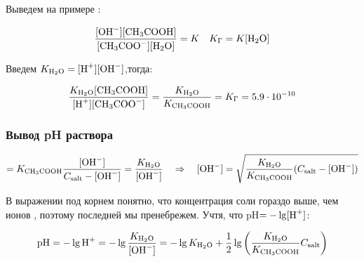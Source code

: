 \documentclass[a4paper, 12pt]{article}
\newcommand{\qrq}
{\ensuremath{\quad \Rightarrow \quad}} %
\begin{document}
Выведем на примере :



\begin{equation*}
	\frac{[\ce{OH-}][\ce{CH3COOH}]}{[\ce{CH3COO-}][\ce{H2O}]} = K \quad K_\Gamma = K[\ce{H2O}] 
\end{equation*}

Введем $K_{\ce{H2O}} = [\ce{H+}][\ce{OH-}]$,тогда:

\begin{equation*}
	\frac{K_{\ce{H2O}}[\ce{CH3COOH}]}{[\ce{H+}][\ce{CH3COO-}]} = \frac{K_{\ce{H2O}}}{K_{\ce{CH3COOH}}} = K_\Gamma = 5.9 \cdot 10^{-10}
\end{equation*}

\subsubsection*{Вывод pH раствора}

\begin{equation*}
	[\ce{H+}] = K_{\ce{CH3COOH}} \frac{[\ce{OH-}]}{C_{\text{salt}} - [\ce{OH-}]} = \frac{K_{\ce{H2O}}}{[\ce{OH-}]} \qrq [\ce{OH-}] = \sqrt{\frac{K_{\ce{H2O}}}{K_{\ce{CH3COOH}}} (C_{\text{salt}} - [\ce{OH-}])}
\end{equation*}

В выражении под корнем понятно, что концентрация соли гораздо выше, чем ионов , поэтому последней мы пренебрежем. Учтя, что pH$=-\lg[\ce{H+}]$:

\begin{equation*}
	\text{pH} = -\lg\ce{H+} = -\lg\frac{K_{\ce{H2O}}}{[\ce{OH-}]} = -\lg K_{\ce{H2O}} + \frac{1}{2}\lg \left(\frac{K_{\ce{H2O}}}{K_{\ce{CH3COOH}}} C_{\text{salt}}\right)
\end{equation*}
\end{document}
